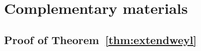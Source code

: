 \documentclass[11pt]{article}
\begin{document}





\appendix
\label{appendix}  


\section{Complementary materials} \label{app:vf}

\subsection{Proof of Theorem~\ref{thm:extendweyl}} \label{sec:ProofOfWeyl2thm}
\end{document}

